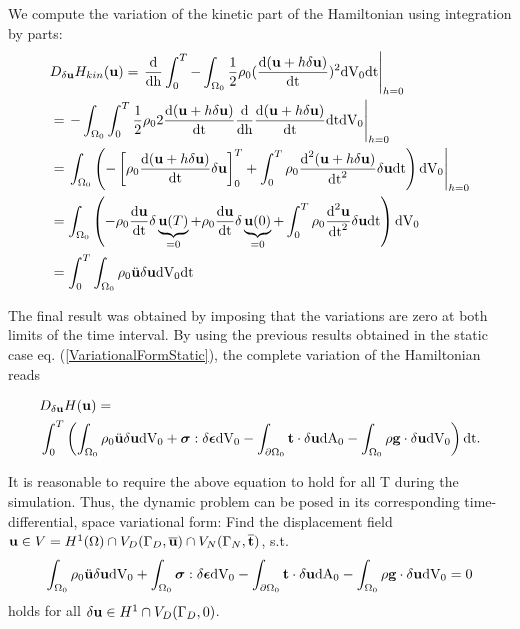 We compute the variation of the kinetic part of the Hamiltonian using integration by parts:
 \begin{alignat}{1}
&D_{\delta \mathbf {u} } H_{kin} (\mathbf {u} )  = \left. \frac{\textnormal{d}}{\textnormal{dh}} \int _0 ^T - \int _{\Omega _0}  \frac{1}{2} \rho_0  (\frac{\textnormal{d}( \mathbf {u}   + h \delta \mathbf {u} )}{\textnormal{dt}} ) ^2  \textnormal{dV}_0 \textnormal{dt}  \right| _{h=0} \\
&= \left.  - \int _{\Omega _0}  \int _0 ^T \frac{1}{2} \rho_0  2 \frac{\textnormal{d}( \mathbf {u}   + h \delta \mathbf {u} )}{\textnormal{dt}} \frac{\textnormal{d}}{\textnormal{dh}} \frac{\textnormal{d}( \mathbf {u}   + h \delta \mathbf {u} )}{\textnormal{dt}}   \textnormal{dt}  \textnormal{dV}_0 \right| _{h=0}  \\
&=  \left.   \int _{\Omega _0}  \left( - \left[  \rho_0  \frac{\textnormal{d}( \mathbf {u}   + h \delta \mathbf {u} )}{\textnormal{dt}} \delta \mathbf {u}    \right]_0 ^T  +  \int _0 ^T \rho_0   \frac{\textnormal{d}^2( \mathbf {u}   + h \delta \mathbf {u} )}{\textnormal{dt}^2} \delta \mathbf {u}   \textnormal{dt}  \right)  \textnormal{dV}_0  \right| _{h=0} \\
&=    \int _{\Omega _0}  \left( -  \rho_0  \frac{\textnormal{d} \mathbf {u}  }{\textnormal{dt}} \delta \underbrace{\mathbf {u} (T)}_{=0} + \rho_0  \frac{\textnormal{d} \mathbf {u}  }{\textnormal{dt}} \delta \underbrace{\mathbf {u} (0)}_{=0}  +  \int _0 ^T \rho_0   \frac{\textnormal{d}^2 \mathbf {u}  }{\textnormal{dt}^2} \delta \mathbf {u}   \textnormal{dt}  \right)  \textnormal{dV}_0  \\
&=   \int _0 ^T \int _{\Omega _0}   \rho_0   \ddot {\mathbf {u} } \delta \mathbf {u}      \textnormal{dV}_0  \textnormal{dt}
\label{KineticVariations}
\end{alignat}

The final result was obtained by imposing that the variations are zero at both limits of the time interval. By using the previous results obtained in the static case eq. (\ref{VariationalFormStatic}), the complete variation of the Hamiltonian reads

 \begin{alignat}{1}
&D_{\delta \mathbf {u} } H (\mathbf {u} )  =  \\
& \int _0 ^T \left( \int _{\Omega _0}   \rho_0   \ddot {\mathbf {u} } \delta \mathbf {u}      \textnormal{dV}_0  + \boldsymbol{\sigma} : \delta \boldsymbol{\epsilon}   \textnormal{dV}_0 - \int _{\partial \Omega _0}  \mathbf {t}  \cdot \delta \mathbf {u}     \textnormal{dA}_0 -  \int _{\Omega _0}  \rho \mathbf {g}  \cdot \delta \mathbf {u}   \textnormal{dV}_0 \right)\textnormal{dt}.
\label{CompleteHamiltonianVariation}
\end{alignat}

It is reasonable to require the above equation to hold for all T during the simulation. Thus, the dynamic problem can be posed in its corresponding time-differential, space variational form: Find the displacement field $\mathbf {u}  \in  V = {H^1(\Omega) \cap V_D(\Gamma _D,\overline{\mathbf {u} }) \cap V_N(\Gamma _N,\overline{\mathbf {t} })}$, s.t. 
 \begin{alignat}{1}
 \int _{\Omega _0}   \rho_0   \ddot {\mathbf {u} } \delta \mathbf {u}      \textnormal{dV}_0  + \int _{\Omega _0}   \boldsymbol{\sigma} : \delta \boldsymbol{\epsilon}   \textnormal{dV}_0 - \int _{\partial \Omega _0}  \mathbf {t}  \cdot \delta \mathbf {u}     \textnormal{dA}_0  -  \int _{\Omega _0}  \rho \mathbf {g}  \cdot \delta \mathbf {u}   \textnormal{dV}_0 = 0
\label{DynamicVariationalForm}
\end{alignat}
holds for all $\delta \mathbf {u}  \in {H}^1 \cap V_D(\Gamma _D,0)$. 





